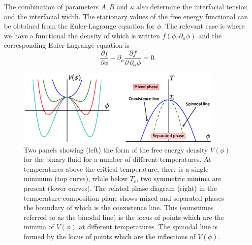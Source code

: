 The combination of parameters $A,B$ and $\kappa$ also determine the
interfacial tension and the interfacial width.
The stationary values of the free energy functional can be obtained
from the Euler-Lagrange equation for $\phi$. The relevant case is
where we have a functional the density of which is written
$f(\phi, \partial_\alpha \phi)$ and the corresponding Euler-Lagrange
equation is
\begin{equation}
\frac{\partial f}{\partial \phi}
- \partial_\alpha \frac{\partial f}{\partial\, \partial_\alpha \phi} = 0.
\end{equation}

\begin{figure}[t]

\includegraphics[width=0.9\textwidth]{figures/symmetric.eps}

\caption{Two panels showing (left) the form of the free energy density
$V(\phi)$ for the binary fluid for a number of different
temperatures. At temperatures above
the critical temperature, there is a single minimum (top curve), while
below $T_c$, two symmetric minima are present (lower curves). The related
phase diagram (right) in the temperature-composition plane shows mixed
and separated phases the boundary of which is the coexistence 
line. This (sometimes referred to as the binodal line) is the locus of
points which are the minima of $V(\phi)$ at different temperatures. The
spinodal line is formed by the locus of points which are the inflections
of $V(\phi)$.}
\label{figure-symmetric-schematic}
\end{figure}


